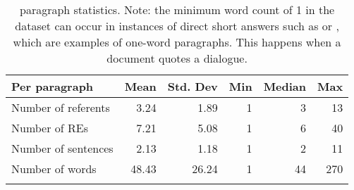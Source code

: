 \begin{table}
\begin{tabular}{lrrrrr}
	\lsptoprule
	Per paragraph & Mean & Std. Dev & Min & Median & Max \\ 
	\midrule
	Number of referents & 3.24 & 1.89 & 1 & 3 & 13 \\ 
	Number of REs & 7.21 & 5.08 & 1 & 6 & 40 \\ 
	Number of sentences & 2.13 & 1.18 & 1 & 2 & 11 \\ 
	Number of words & 48.43 & 26.24 & 1\footnotemark & 44 & 270 \\ 
	\lspbottomrule
\end{tabular}
\caption{\wsj paragraph statistics. Note: the minimum word count of 1 in the dataset can occur in instances of direct short answers such as  or , which are examples of one-word paragraphs. This happens when a document quotes a dialogue.}\label{tab:inparstat}
\end{table}

